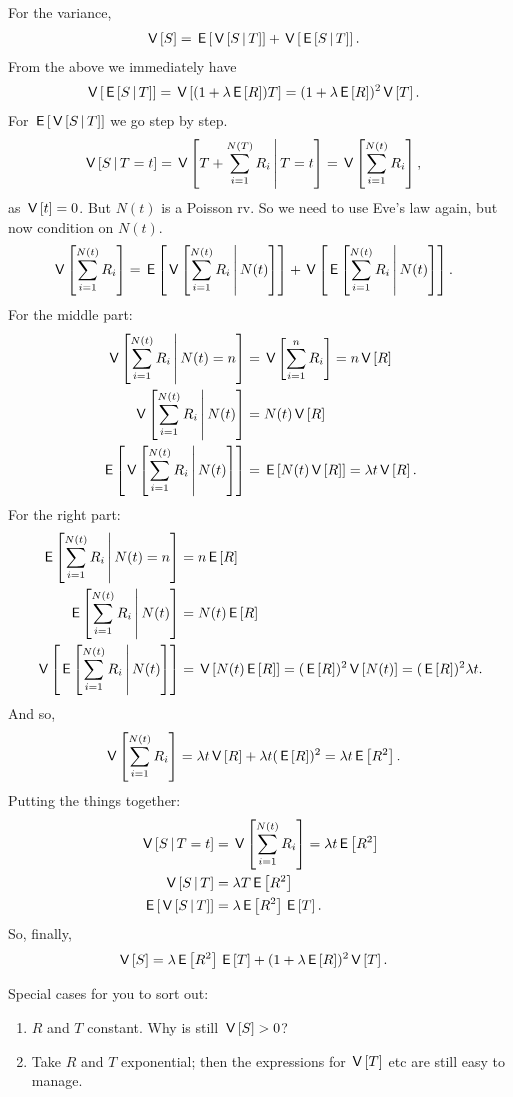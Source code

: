 \documentclass[lectures]{subfiles}
\begin{document}
\begin{exercise}
\begin{solution}
For the variance,
\begin{align}
\V S &= \E{\V{S\given T}} + \V{\E{S\given T}}.
\end{align}
From the above we immediately have
\begin{align}
\V{\E{S\given T}} &= \V{(1+\lambda \E R) T} = (1+\lambda\E R)^{2} \V T.
\end{align}
For $\E{\V{S\given T}}$ we go step  by step.
\begin{align}
\V{S\given T=t} &= \V{T + \sum_{i=1}^{N(T)} R_{i}\given T=t} = \V{\sum_{i=1}^{N(t)} R_{i}},
\end{align}
as $\V t = 0$. But $N(t)$ is a Poisson rv. So we need to use Eve's law again, but now condition on $N(t)$.
\begin{align}
\V{\sum_{i=1}^{N(t)} R_{i}} &= \E{\V{\sum_{i=1}^{N(t)} R_{i}\given N(t)}} + \V{\E{\sum_{i=1}^{N(t)} R_{i}\given N(t)}}.
\end{align}
For the middle part:
\begin{align}
\V{\sum_{i=1}^{N(t)} R_{i}\given N(t)=n} &= \V{\sum_{i=1}^{n} R_{i}}  = n \V R \\
\V{\sum_{i=1}^{N(t)} R_{i}\given N(t)} &= N(t) \V R \\
\E{\V{\sum_{i=1}^{N(t)} R_{i}\given N(t)}} &= \E{N(t) \V R}=  \lambda t \V R.
\end{align}
For the right part:
\begin{align}
\E{\sum_{i=1}^{N(t)} R_{i}\given N(t)=n} &= n \E R\\
\E{\sum_{i=1}^{N(t)} R_{i}\given N(t)} &= N(t) \E R\\
\V{\E{\sum_{i=1}^{N(t)} R_{i}\given N(t)}} &= \V{N(t)\E R} = (\E R)^{2} \V{N(t)} = (\E R)^{2} \lambda t.
\end{align}
And so,
\begin{align}
\V{\sum_{i=1}^{N(t)} R_{i}} &= \lambda t \V R  + \lambda t (\E R)^{2}  = \lambda t \E{R^{2}}.
\end{align}
Putting the things together:
\begin{align}
\V{S\given T=t} &= \V{\sum_{i=1}^{N(t)} R_{i}} = \lambda t \E{R^{2}}\\
\V{S\given T} &= \lambda T \E{R^{2}}\\
\E{\V{S\given T}} &= \lambda \E{R^{2}} \E T.
\end{align}
So, finally,
\begin{align}
\V S &= \lambda \E{R^{2}} \E T + (1+\lambda\E R)^{2} \V T.
\end{align}

Special cases for you to sort out:
\begin{enumerate}
\item  $R$ and $T$ constant. Why is still $\V S > 0$?
\item Take $R$ and $T$ exponential; then the expressions for $\V T$ etc are still easy to manage.
\end{enumerate}
\end{solution}
\end{exercise}
\end{document}
